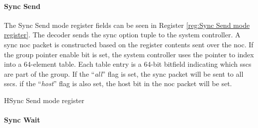 \paragraph{Sync Send}

The Sync Send mode register fields can be seen in Register \ref{reg:Sync Send mode register}.
The decoder sends the sync option tuple to the system controller.
A sync \ac{noc} packet is constructed based on the register contents sent over the \ac{noc}.
If the group pointer enable bit is set, the system controller uses the pointer to index into a 64-element table. 
Each table entry is a 64-bit bitfield indicating which \acp{ssc} are part of the group.
If the ``{\textit{all}}'' flag is set, the sync packet will be sent to all \acp{ssc}.
if the ``{\textit{host}}'' flag is also set, the host bit in the \ac{noc} packet will be set.
\begin{register}{H}{Sync Send mode register}{}%
  \label{reg:Sync Send mode register}
  \vspace{-20pt}
\end{register}

\paragraph{Sync Wait}

